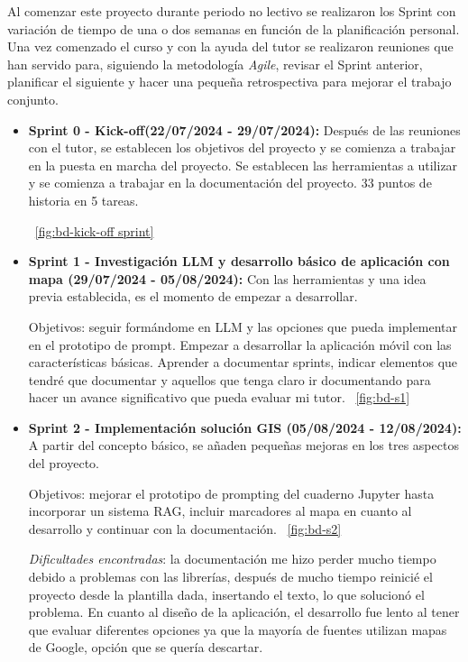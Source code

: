 Al comenzar este proyecto durante periodo no lectivo se realizaron los Sprint con variación de tiempo de una o dos semanas en función de la planificación personal. Una vez comenzado el curso y con la ayuda del tutor se realizaron reuniones que han servido para, siguiendo la metodología \textit{Agile}, revisar el Sprint anterior, planificar el siguiente y hacer una pequeña retrospectiva para mejorar el trabajo conjunto.


\begin{itemize}
    \item \textbf{Sprint 0 - Kick-off(22/07/2024 - 29/07/2024):} Después de las reuniones con el tutor, se establecen los objetivos del proyecto y se comienza a trabajar en la puesta en marcha del proyecto. Se establecen las herramientas a utilizar y se comienza a trabajar en la documentación del proyecto. 33 puntos de historia en 5 tareas.
    
    ~\ref{fig:bd-kick-off sprint}

    \item \textbf{Sprint 1 - Investigación LLM y desarrollo básico de aplicación con mapa (29/07/2024 - 05/08/2024):} Con las herramientas y una idea previa establecida, es el momento de empezar a desarrollar.
    

    Objetivos: seguir formándome en LLM y las opciones que pueda implementar en el prototipo de prompt.
    Empezar a desarrollar la aplicación móvil con las características básicas.
    Aprender a documentar sprints, indicar elementos que tendré que documentar y aquellos que tenga claro ir documentando para hacer un avance significativo que pueda evaluar mi tutor.
    ~\ref{fig:bd-s1}
    
    \item \textbf{Sprint 2 - Implementación solución GIS (05/08/2024 - 12/08/2024):} A partir del concepto básico, se añaden pequeñas mejoras en los tres aspectos del proyecto.
    
    Objetivos: mejorar el prototipo de prompting del cuaderno Jupyter hasta incorporar un sistema RAG, incluir marcadores al mapa en cuanto al desarrollo y continuar con la documentación.
    ~\ref{fig:bd-s2}
    
    \textit{Dificultades encontradas}: la documentación me hizo perder mucho tiempo debido a problemas con las librerías, después de mucho tiempo reinicié el proyecto desde la plantilla dada, insertando el texto, lo que solucionó el problema. En cuanto al diseño de la aplicación, el desarrollo fue lento al tener que evaluar diferentes opciones ya que la mayoría de fuentes utilizan mapas de Google, opción que se quería descartar.
 


\end{itemize}
